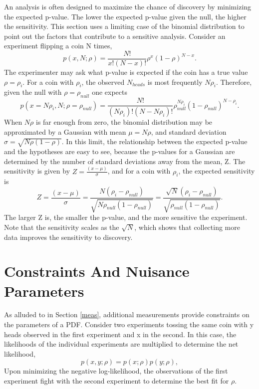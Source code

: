 An analysis is often designed to maximize the chance of discovery by minimizing the expected p-value. The lower the expected p-value given the null, the higher the sensitivity. This section uses a limiting case of the binomial distribution to point out the factors that contribute to a sensitive analysis. Consider an experiment flipping a coin N times, 
\begin{equation}
p(x,N;\rho) = \frac{N!}{x! (N - x)!}\rho^{x}(1-\rho)^{N-x}.
\end{equation}
The experimenter may ask what p-value is expected if the coin has a true value $\rho=\rho_i$. For a coin with $\rho_i$, the observed $N_{heads}$ is most frequently $N\rho_i$. Therefore, given the null with $\rho=\rho_{null}$ one expects
\begin{equation}
p(x=N\rho_i,N;\rho=\rho_{null}) = \frac{N!}{(N\rho_i)! (N - N\rho_i)!}\rho_{null}^{N\rho_i}(1-\rho_{null})^{N-\rho_i}.
\end{equation}
When $N\rho$ is far enough from zero, the binomial distribution may be approximated by a Gaussian with mean $\mu=N\rho$, and standard deviation $\sigma=\sqrt{N\rho(1-\rho)}$. In this limit, the relationship between the expected p-value and the hypotheses are easy to see, because the p-values for a Gaussian are determined by the number of standard deviations away from the mean, Z. The sensitivity is given by $Z=\frac{(x-\mu)}{\sigma}$, and for a coin with $\rho_i$, the expected sensitivity is 
\begin{equation}
Z = \frac{(x-\mu)}{\sigma} = \frac{N(\rho_i - \rho_{null})}{\sqrt{N\rho_{null}(1-\rho_{null})}} = \frac{\sqrt{N}(\rho_i - \rho_{null})}{\sqrt{\rho_{null}(1-\rho_{null})}}.
\end{equation}
The larger Z is, the smaller the p-value, and the more sensitive the experiment. Note that the sensitivity scales as the $\sqrt{N}$, which shows that collecting more data improves the sensitivity to discovery. 

\section{Constraints And Nuisance Parameters}
\label{constraints}

As alluded to in Section \ref{meas}, additional measurements provide constraints on the parameters of a PDF. Consider two experiments tossing the same coin with y heads observed in the first experiment and x in the second. In this case, the likelihoods of the individual experiments are multiplied to determine the net likelihood, 
\begin{equation}
p(x, y; \rho) = p(x; \rho)p(y; \rho),
\end{equation}
Upon minimizing the negative log-likelihood, the observations of the first experiment fight with the second experiment to determine the best fit for $\rho$. 

